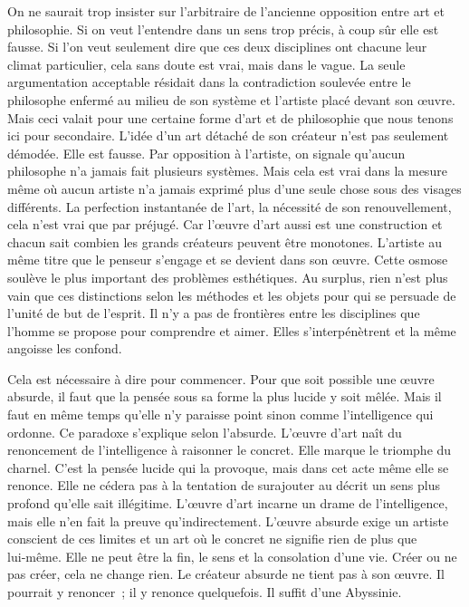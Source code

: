 \documentclass{book}
\begin{document}
On ne saurait trop insister sur l'arbitraire de l'ancienne opposition entre art et philosophie. Si on veut l'entendre dans un sens trop précis, à coup sûr elle est fausse. Si l'on veut seulement dire que ces deux disciplines ont chacune leur climat particulier, cela sans doute est vrai, mais dans le vague. La seule argumentation acceptable résidait dans la contradiction soulevée entre le philosophe enfermé au milieu de son système et l'artiste placé devant son œuvre. Mais ceci valait pour une certaine forme d'art et de philosophie que nous tenons ici pour secondaire. L'idée d'un art détaché de son créateur n'est pas seulement démodée. Elle est fausse. Par opposition à l'artiste, on signale qu'aucun philosophe n’a jamais fait plusieurs systèmes. Mais cela est vrai dans la mesure même où aucun artiste n'a jamais exprimé plus d'une seule chose sous des visages différents. La perfection instantanée de l'art, la nécessité de son renouvellement, cela n'est vrai que par préjugé. Car l'œuvre d'art aussi est une construction et chacun sait combien les grands créateurs peuvent être monotones. L'artiste au même titre que le penseur s'engage et se devient dans son œuvre. Cette osmose soulève le plus important des problèmes esthétiques. Au surplus, rien n'est plus vain que ces distinctions selon les méthodes et les objets pour qui se persuade de l'unité de but de l'esprit. Il n'y a pas de frontières entre les disciplines que l'homme se propose pour comprendre et aimer. Elles s'interpénètrent et la même angoisse les confond.

Cela est nécessaire à dire pour commencer. Pour que soit possible une œuvre absurde, il faut que la pensée sous sa forme la plus lucide y soit mêlée. Mais il faut en même temps qu'elle n'y paraisse point sinon comme l'intelligence qui ordonne. Ce paradoxe s'explique selon l'absurde. L'œuvre d'art naît du renoncement de l'intelligence à raisonner le concret. Elle marque le triomphe du charnel. C'est la pensée lucide qui la provoque, mais dans cet acte même elle se renonce. Elle ne cédera pas à la tentation de surajouter au décrit un sens plus profond qu'elle sait illégitime. L'œuvre d'art incarne un drame de l'intelligence, mais elle n'en fait la preuve qu'indirectement. L’œuvre absurde exige un artiste conscient de ces limites et un art où le concret ne signifie rien de plus que lui‑même. Elle ne peut être la fin, le sens et la consolation d'une vie. Créer ou ne pas créer, cela ne change rien. Le créateur absurde ne tient pas à son œuvre. Il pourrait y renoncer ; il y renonce quelquefois. Il suffit d'une Abyssinie.
\end{document}
